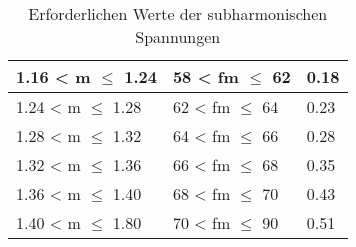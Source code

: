 \begin{appendix}
\begin{table}[ht!]
\begin{tabular}{|l|l|l|}
		1.16 < m $\leq$ 1.24                                                                            & 58 < fm $\leq$ 62                                                                                                    & 0.18                        \\ \hline
		1.24 < m $\leq$ 1.28                                                                            & 62 < fm $\leq$ 64                                                                                                    & 0.23                        \\ \hline
		1.28 < m $\leq$ 1.32                                                                            & 64 < fm $\leq$ 66                                                                                                    & 0.28                        \\ \hline
		1.32 < m $\leq$ 1.36                                                                            & 66 < fm $\leq$ 68                                                                                                    & 0.35                        \\ \hline
		1.36 < m $\leq$ 1.40                                                                             & 68 < fm $\leq$ 70                                                                                                    & 0.43                        \\ \hline
		1.40 < m $\leq$ 1.80                                                                              & 70 < fm $\leq$ 90                                                                                                    & 0.51                        \\ \hline
	\end{tabular}
	\caption{Erforderlichen Werte der subharmonischen Spannungen}\label{tab:subharmonische_Spannung}
\end{table}


\end{appendix}
